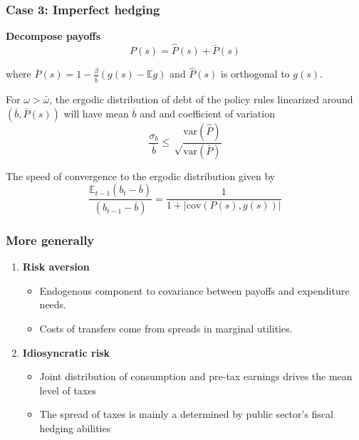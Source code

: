 \documentclass{beamer}
\newcommand{\EE}{\mathbb E}
\newcommand{\var}{\mathrm{var}}
\newcommand{\cov}{\mathrm{cov}}
\begin{document}
\begin{frame}
 \frametitle{Case 3: Imperfect hedging}

\textbf{Decompose payoffs} \[P(s)=\hat{P}(s)+\bar{P}(s)\] 

where	$\overline{P}(s) = 1- \frac{\beta}{\overline b}( g(s) - \mathbb{E} g)$ and  $\hat{P}(s)$ is orthogonal to $g(s)$. 

	

\begin{theorem}
For $\omega>\bar{\omega}$, the ergodic distribution of debt of the policy rules linearized around $(\overline b, \overline{P}(s))$ will have mean $\overline b$ and and coefficient of variation
	\[
			\frac{\sigma_b} {\overline b} \leq 	\sqrt \frac{\var(\hat P)}  {\var(\bar{P})}
	\]

	The speed of convergence to the ergodic distribution given by
	\[
		\frac{\EE_{t-1}(b_t-\overline b)}{(b_{t-1} - \overline b)} = \frac1{1+|\cov(P(s),g(s))|}
	\]


\end{theorem}




\end{frame}






\begin{frame}
 \frametitle{More generally}
 
 \begin{enumerate}
  
 \item \textbf{Risk aversion}
 
 \begin{itemize}
  \item Endogenous component to covariance between payoffs and expenditure needs.
  
  \item Costs of transfers come from spreads in marginal utilities.
  
  
  \end{itemize}
  \vspace{3mm}
 \item \textbf{Idiosyncratic risk}
 \begin{itemize}
\item Joint distribution of consumption and pre-tax earnings drives the mean level of taxes
\item The spread of taxes is mainly a determined by public sector's fiscal hedging abilities

 \end{itemize}

\end{enumerate}

 \end{frame}
 
\end{document}
